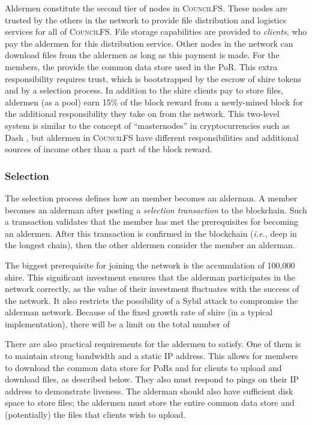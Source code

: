 \documentclass{article}
\begin{document}
Aldermen constitute the second tier of nodes in \textsc{CouncilFS}. These nodes
are trusted by the others in the network to provide file distribution and
logistics services for all of \textsc{CouncilFS}. File storage capabilities are
provided to \emph{clients}, who pay the aldermen for this distribution service.
Other nodes in the network can download files from the aldermen as long as this
payment is made. For the members, the provide the common data store used in the
PoR. This extra responsibility requires trust, which is bootstrapped by the
escrow of shire tokens and by a selection process. In addition to the shire
clients pay to store files, aldermen (as a pool) earn 15\% of the block reward
from a newly-mined block for the additional responsibility they take on from the
network. This two-level system is similar to the concept of ``masternodes'' in
cryptocurrencies such as Dash \cite{dash-coin}, but aldermen in
\textsc{CouncilFS} have different responsibilities and additional sources of
income other than a part of the block reward.

\subsubsection{Selection}

The selection process defines how an member becomes an alderman. A member
becomes an alderman after posting a \emph{selection transaction} to the
blockchain. Such a transaction validates that the member has met the
prerequisites for becoming an aldermen. After this transaction is confirmed in
the blockchain (\emph{i.e.}, deep in the longest chain), then the other aldermen
consider the member an alderman.

The biggest prerequisite for joining the network is the accumulation of 100,000
shire. This significant investment ensures that the alderman participates in the
network correctly, as the value of their investment fluctuates with the success
of the network. It also restricts the possibility of a Sybil attack to
compromise the alderman network. Because of the fixed growth rate of shire (in a
typical implementation), there will be a limit on the total number of

There are also practical requirements for the aldermen to satisfy. One of them
is to maintain strong bandwidth and a static IP address. This allows for members
to download the common data store for PoRs and for clients to upload and
download files, as described below. They also must respond to pings on their IP
address to demonstrate liveness. The alderman should also have sufficient disk
space to store files; the aldermen must store the entire common data store and
(potentially) the files that clients wish to upload.
\end{document}
